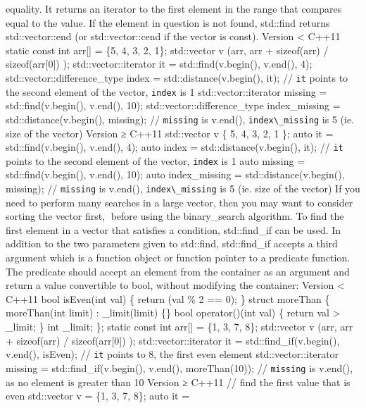 equality. It returns an iterator to the ﬁrst element in the range that
compares equal to the value. If the element in question is not found,
std::find returns std::vector::end (or std::vector::cend if the vector
is const). Version \textless{} C++11 static const int arr{[}{]} = \{5,
4, 3, 2, 1\}; std::vector v (arr, arr + sizeof(arr) / sizeof(arr{[}0{]})
); std::vector::iterator it = std::find(v.begin(), v.end(), 4);
std::vector::difference\_type index = std::distance(v.begin(), it); //
\passthrough{\lstinline!it!} points to the second element of the vector,
\passthrough{\lstinline!index!} is 1 std::vector::iterator missing =
std::find(v.begin(), v.end(), 10); std::vector::difference\_type
index\_missing = std::distance(v.begin(), missing); //
\passthrough{\lstinline!missing!} is v.end(),
\passthrough{\lstinline!index\_missing!} is 5 (ie. size of the vector)
Version ≥ C++11 std::vector v \{ 5, 4, 3, 2, 1 \}; auto it =
std::find(v.begin(), v.end(), 4); auto index = std::distance(v.begin(),
it); // \passthrough{\lstinline!it!} points to the second element of the
vector, \passthrough{\lstinline!index!} is 1 auto missing =
std::find(v.begin(), v.end(), 10); auto index\_missing =
std::distance(v.begin(), missing); // \passthrough{\lstinline!missing!}
is v.end(), \passthrough{\lstinline!index\_missing!} is 5 (ie. size of
the vector) If you need to perform many searches in a large vector, then
you may want to consider sorting the vector ﬁrst, before using the
binary\_search algorithm. To ﬁnd the ﬁrst element in a vector that
satisﬁes a condition, std::find\_if can be used. In addition to the two
parameters given to std::find, std::find\_if accepts a third argument
which is a function object or function pointer to a predicate function.
The predicate should accept an element from the container as an argument
and return a value convertible to bool, without modifying the container:
Version \textless{} C++11 bool isEven(int val) \{ return (val \% 2 ==
0); \} struct moreThan \{ moreThan(int limit) : \_limit(limit) \{\} bool
operator()(int val) \{ return val \textgreater{} \_limit; \} int
\_limit; \}; static const int arr{[}{]} = \{1, 3, 7, 8\}; std::vector v
(arr, arr + sizeof(arr) / sizeof(arr{[}0{]}) ); std::vector::iterator it
= std::find\_if(v.begin(), v.end(), isEven); //
\passthrough{\lstinline!it!} points to 8, the first even element
std::vector::iterator missing = std::find\_if(v.begin(), v.end(),
moreThan(10)); // \passthrough{\lstinline!missing!} is v.end(), as no
element is greater than 10 Version ≥ C++11 // find the first value that
is even std::vector v = \{1, 3, 7, 8\}; auto it =
